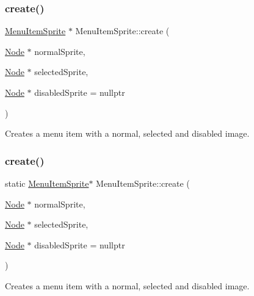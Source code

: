 \subsubsection{\texorpdfstring{create()}{create()}\hspace{0.1cm}{\footnotesize\ttfamily [1/10]}}
{\footnotesize\ttfamily \hyperlink{classMenuItemSprite}{Menu\+Item\+Sprite} $\ast$ Menu\+Item\+Sprite\+::create (\begin{DoxyParamCaption}\item[{\hyperlink{classNode}{Node} $\ast$}]{normal\+Sprite,  }\item[{\hyperlink{classNode}{Node} $\ast$}]{selected\+Sprite,  }\item[{\hyperlink{classNode}{Node} $\ast$}]{disabled\+Sprite = {\ttfamily nullptr} }\end{DoxyParamCaption})\hspace{0.3cm}{\ttfamily [static]}}

Creates a menu item with a normal, selected and disabled image. \mbox{\label{classMenuItemSprite_ae10169fd35fe93ab753cb128858a12da}} 
\subsubsection{\texorpdfstring{create()}{create()}\hspace{0.1cm}{\footnotesize\ttfamily [2/10]}}
{\footnotesize\ttfamily static \hyperlink{classMenuItemSprite}{Menu\+Item\+Sprite}$\ast$ Menu\+Item\+Sprite\+::create (\begin{DoxyParamCaption}\item[{\hyperlink{classNode}{Node} $\ast$}]{normal\+Sprite,  }\item[{\hyperlink{classNode}{Node} $\ast$}]{selected\+Sprite,  }\item[{\hyperlink{classNode}{Node} $\ast$}]{disabled\+Sprite = {\ttfamily nullptr} }\end{DoxyParamCaption})\hspace{0.3cm}{\ttfamily [static]}}

Creates a menu item with a normal, selected and disabled image. \mbox{\label{classMenuItemSprite_a96aec305060ca3ab7ce8e15de7d7d3ff}} 
